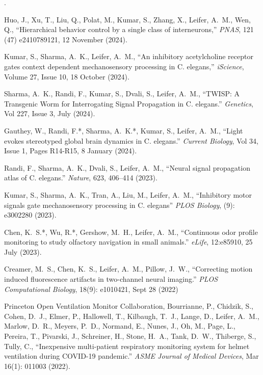 \documentclass[11pt]{article}
\makeatletter
\newlength{\bibhang}
\newlength{\bibsep}
\newcounter{Lcount}
 {\@listi \global\bibsep\itemsep \global\advance\bibsep by\parsep}
\newenvironment{bibsection}%
        {\begin{list}{\arabic{Lcount}.}{%
       \usecounter{Lcount}%
       \setlength\labelwidth{-0.5em}%
       \setlength{\leftmargin}{\bibhang}%
       \setlength{\itemindent}{-\leftmargin}%
       \setlength{\itemsep}{.2\baselineskip}%
       \setlength{\parsep}{\z@}%
        \setlength{\partopsep}{0pt}%
        \setlength{\topsep}{0pt}}}
        {\end{list}\vspace{-.9\baselineskip}}
\makeatother
\begin{document}
\begin{bibsection}
\item Huo, J., Xu, T., Liu, Q., Polat, M., Kumar, S., Zhang, X., Leifer, A.~M., Wen, Q., ``Hierarchical behavior control by a single class of interneurons,'' \textit{PNAS}, 121 (47) e2410789121, 12 November (2024).

\item Kumar, S., Sharma, A.~K., Leifer, A.~M., ``An inhibitory acetylcholine receptor gates context dependent mechanosensory processing in C. elegans,'' \textit{iScience}, Volume 27, Issue 10, 18 October (2024).

\item Sharma, A.~K., Randi, F., Kumar, S., Dvali, S., Leifer, A.~M., ``TWISP: A Transgenic Worm for Interrogating Signal Propagation in C. elegans.'' \textit{Genetics}, Vol 227, Issue 3, July (2024).

\item Gauthey, W., Randi, F.*, Sharma, A.~K.*, Kumar, S., Leifer, A.~M., ``Light evokes stereotyped global brain dynamics in C. elegans.'' \textit{Current Biology}, Vol 34, Issue 1, Pages R14-R15, 8 January (2024).

\item Randi, F., Sharma, A.~K., Dvali, S., Leifer, A.~M., ``Neural signal propagation atlas of C. elegans.'' \textit{Nature}, 623, 406–414 (2023).

\item Kumar, S., Sharma, A.~K., Tran, A., Liu, M., Leifer, A.~M., ``Inhibitory motor signals gate mechanosensory processing in C. elegans'' \textit{PLOS Biology}, (9): e3002280 (2023).

\item Chen, K.~S.*, Wu, R.*, Gershow, M.~H., Leifer, A.~M., ``Continuous odor profile monitoring to study olfactory navigation in small animals.'' \textit{eLife}, 12:e85910, 25 July (2023).

\item Creamer, M.~S., Chen, K.~S., Leifer, A.~M., Pillow, J.~W., ``Correcting motion induced fluorescence artifacts in two-channel neural imaging.'' \textit{PLOS Computational Biology}, 18(9): e1010421, Sept 28 (2022)

\item Princeton Open Ventilation Monitor Collaboration, Bourrianne, P., Chidzik, S., Cohen, D.~J., Elmer, P., Hallowell, T., Kilbaugh, T.~J., Lange, D., Leifer, A.~M., Marlow, D.~R., Meyers, P.~D., Normand, E., Nunes, J., Oh, M., Page, L., Pereira, T., Pivarski, J., Schreiner, H., Stone, H.~A., Tank, D.~W., Thiberge, S., Tully, C., ``Inexpensive multi-patient respiratory monitoring system for helmet ventilation during COVID-19 pandemic.'' \textit{ASME Journal of Medical Devices}, Mar 16(1): 011003 (2022).


\end{bibsection}
\end{document}
